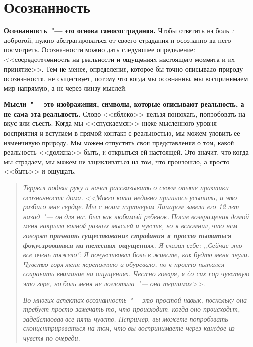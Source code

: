 
\chapter{Осознанность} \label{Mindfulness}

\textbf{Осознанность~"--- это основа самосострадания.} Чтобы ответить на боль с добротой, нужно абстрагироваться от своего страдания и осознанно на него посмотреть. Осознанности можно дать следующее определение: <<сосредоточенность на реальности и ощущениях настоящего момента и их принятие>>. Тем не менее, определения, которое бы точно описывало природу осознанности, не существует, потому что когда мы осознанны, мы воспринимаем мир напрямую, а не через линзу мыслей. 

\textbf{Мысли~"--- это изображения, символы, которые описывают реальность, а не сама эта реальность.} Слово <<яблоко>> нельзя понюхать, попробовать на вкус или съесть. Когда мы <<спускаемся>> ниже мысленного уровня восприятия и вступаем в прямой контакт с реальностью, мы можем уловить ее изменчивую природу. Мы можем отпустить свои представления о том, какой реальность <<должна>> быть, и открыться ей настоящей. Это значит, что когда мы страдаем, мы можем не зацикливаться на том, что произошло, а просто <<быть>> и ощущать. 

\begin{quotation}
	\textit{Террелл поднял руку и начал рассказывать о своем опыте практики осознанности дома. <<Моего кота недавно пришлось усыпить, и это разбило мне сердце. Мы с моим партнером Ламаром завели его 12 лет назад~"--- он для нас был как любимый ребенок. После возвращения домой меня накрыло волной разных мыслей и чувств, но я вспомнил, что нам говорят \textbf{признать существование страдания и просто пытаться фокусироваться на телесных ощущениях}. Я сказал себе: ,,Сейчас это все очень тяжело``. Я почувствовал боль в животе, как будто меня пнули. Чувство горя меня переполняло и обуревало, но я просто пытался сохранить внимание на ощущениях. Честно говоря, я до сих пор чувствую это горе, но боль меня не поглотила~"--- она терпимая>>.}
		
	\textit{Во многих аспектах осознанность~"--- это простой навык, поскольку она требует просто замечать то, что происходит, когда оно происходит, задействовав все пять чувств. Например, вы можете попробовать сконцентрироваться на том, что вы воспринимаете через каждое из чувств по очереди.}	
\end{quotation}

